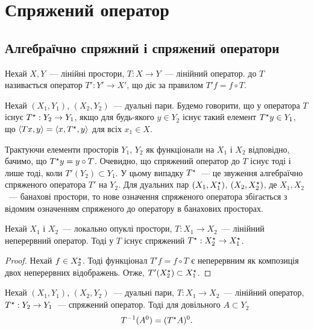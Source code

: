 \chapter{Спряжений оператор}

\section{Алгебраїчно спряжний і спряжений оператори}

\begin{definition}
    Нехай $X, Y$~--- лінійні простори, $T: X \to Y$~--- лінійний оператор.  до $T$ називається оператор $T': Y' \to X'$, що діє за правилом $T' f = f \circ T$.
\end{definition}

\begin{definition}
    Нехай $(X_1, Y_1)$, $(X_2, Y_2)$~--- дуальні пари. Будемо говорити, що у оператора $T$ існує  $T^\star: Y_2 \to Y_1$, якщо для будь-якого $y \in Y_2$ існує такий елемент $T^\star y \in Y_1$, що $\langle T x, y \rangle = \langle x, T^\star, y \rangle$ для всіх $x_1 \in X$.
\end{definition}

Трактуючи елементи просторів $Y_1$, $Y_2$ як функціонали на $X_1$ і $X_2$ відповідно, бачимо, що $T^\star y = y \circ T$. Очевидно, що спряжений оператор до $T$ існує тоді і лише тоді, коли $T'(Y_2) \subset Y_1$. У цьому випадку $T^\star$~--- це звуження алгебраїчно спряженого оператора $T'$ на $Y_2$. Для дуальних пар $(X_1, X^\star_1)$, $(X_2, X^\star_2)$, де $X_1, X_2$~--- банахові простори, то нове означення спряженого оператора збігається з відомим означенням спряженого до оператору в банахових просторах.

\begin{theorem}
    Нехай $X_1$ і $X_2$~--- локально опуклі простори, $T: X_1 \to X_2$~--- лінійний неперервний оператор. Тоді у $T$ існує спряжений $T^\star: X^\star_2 \to X^\star_1$.
\end{theorem}

\begin{proof}
    Нехай $f \in X^\star_2$. Тоді функціонал $T' f = f \circ T$ є неперервним як композиція двох неперервних відображень. Отже, $T'(X^\star_2) \subset X^\star_1$.
\end{proof}

\begin{theorem}
    Нехай $(X_1, Y_1)$, $(X_2, Y_2)$~--- дуальні пари, $T: X_1 \to X_2$~--- лінійний оператор, $T^\star: Y_2 \to Y_1$~--- спряжений оператор. Тоді для довільного $A \subset Y_2$
    \begin{equation*}
        T^{-1}(A^0) = (T^\star A)^0.
    \end{equation*}
\end{theorem}

